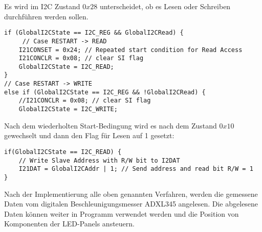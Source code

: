 Es wird im I2C Zustand $0x28$ unterscheidet, ob es Lesen oder Schreiben durchführen werden sollen.
\begin{lstlisting}
if (GlobalI2CState == I2C_REG && GlobalI2CRead) {
     // Case RESTART -> READ
	I21CONSET = 0x24; // Repeated start condition for Read Access
	I21CONCLR = 0x08; // clear SI flag
	GlobalI2CState = I2C_READ;
}
// Case RESTART -> WRITE
else if (GlobalI2CState == I2C_REG && !GlobalI2CRead) {
	//I21CONCLR = 0x08; // clear SI flag
	GlobalI2CState = I2C_WRITE;
\end{lstlisting}

Nach dem wiederholten Start-Bedingung wird es nach dem Zustand $0x10$ gewechselt und dann den Flag für Lesen auf 1 gesetzt:
\begin{lstlisting}
if(GlobalI2CState == I2C_READ) {
	// Write Slave Address with R/W bit to I2DAT
	I21DAT = GlobalI2CAddr | 1; // Send address and read bit R/W = 1
}
\end{lstlisting}

Nach der Implementierung alle oben genannten Verfahren, werden die gemessene Daten vom digitalen Beschleunigungsmesser ADXL345 angelesen. Die abgelesene Daten können weiter in Programm verwendet werden und die Position von Komponenten der LED-Panels ansteuern.

\clearpage